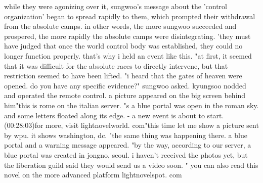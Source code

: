 while they were agonizing over it, sungwoo's message about the 'control organization' began to spread rapidly to them, which prompted their withdrawal from the absolute camps.
in other words, the more sungwoo succeeded and prospered, the more rapidly the absolute camps were disintegrating.
'they must have judged that once the world control body was established, they could no longer function properly.
 that's why i held an event like this.
"at first, it seemed that it was difficult for the absolute races to directly intervene, but that restriction seemed to have been lifted.
"i heard that the gates of heaven were opened.
 do you have any specific evidence?" sungwoo asked.
 kyungsoo nodded and operated the remote control.
 a picture appeared on the big screen behind him"this is rome on the italian server.
"s a blue portal was open in the roman sky.
 and some letters floated along its edge.
- a new event is about to start.
 (00:28:03)for more, visit lightnovelworld.
com"this time let me show a picture sent by wpu.
 it shows washington, dc.
"the same thing was happening there.
 a blue portal and a warning message appeared.
"by the way, according to our server, a blue portal was created in jongno, seoul.
 i haven't received the photos yet, but the liberation guild said they would send us a video soon.
" you can also read this novel on the more advanced platform lightnovelspot.
com

 